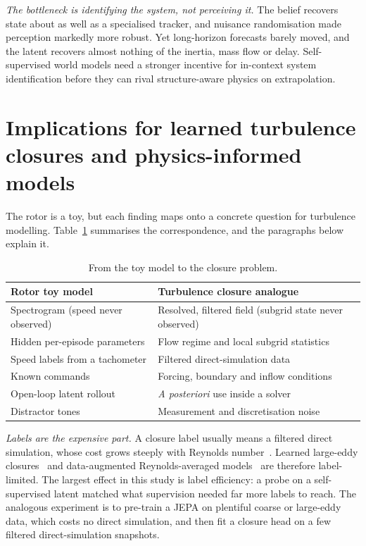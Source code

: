 \documentclass[10pt,journal]{IEEEtran}
\begin{document}
\emph{The bottleneck is identifying the system, not perceiving it.} The belief recovers state about as well as a specialised tracker, and nuisance randomisation made perception markedly more robust. Yet long-horizon forecasts barely moved, and the latent recovers almost nothing of the inertia, mass flow or delay. Self-supervised world models need a stronger incentive for in-context system identification before they can rival structure-aware physics on extrapolation.

\section{Implications for learned turbulence closures and physics-informed models}\label{sec:implications}
The rotor is a toy, but each finding maps onto a concrete question for turbulence modelling. Table~\ref{tab:mapping} summarises the correspondence, and the paragraphs below explain it.

\begin{table}[!t]\centering\footnotesize
\caption{From the toy model to the closure problem.}
\label{tab:mapping}
\begin{tabular}{@{}p{}p{}@{}}
\toprule
Rotor toy model & Turbulence closure analogue\\
\midrule
Spectrogram (speed never observed) & Resolved, filtered field (subgrid state never observed)\\
Hidden per-episode parameters & Flow regime and local subgrid statistics\\
Speed labels from a tachometer & Filtered direct-simulation data\\
Known commands & Forcing, boundary and inflow conditions\\
Open-loop latent rollout & \emph{A posteriori} use inside a solver\\
Distractor tones & Measurement and discretisation noise\\
\bottomrule
\end{tabular}
\end{table}

\emph{Labels are the expensive part.} A closure label usually means a filtered direct simulation, whose cost grows steeply with Reynolds number~\cite{pope2000turbulent}. Learned large-eddy closures~\cite{beck2019les,maulik2019subgrid} and data-augmented Reynolds-averaged models~\cite{duraisamy2019turbulence,duraisamy2021perspectives} are therefore label-limited. The largest effect in this study is label efficiency: a probe on a self-supervised latent matched what supervision needed far more labels to reach. The analogous experiment is to pre-train a JEPA on plentiful coarse or large-eddy data, which costs no direct simulation, and then fit a closure head on a few filtered direct-simulation snapshots.
\end{document}
